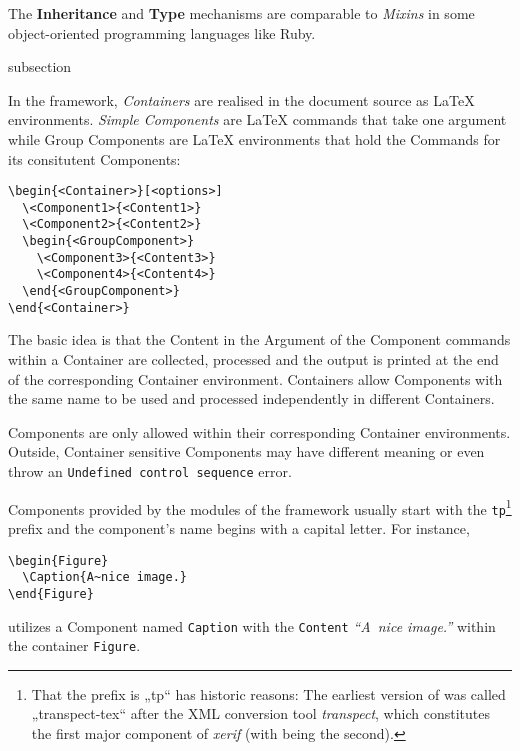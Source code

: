 The \textbf{Inheritance} and \textbf{Type} mechanisms are comparable
to \textit{Mixins} in some object-oriented programming languages like
Ruby.


\begin{Heading}{subsection}
\end{Heading}

In the {\CoCoTeX} framework, \textit{Containers} are realised in the
document source as {\LaTeX} environments. \textit{Simple Components}
are {\LaTeX} commands that take one argument while Group Components
are {\LaTeX} environments that hold the Commands for its consitutent
Components:
\begin{lstlisting}[style=tex]
\begin{<Container>}[<options>]
  \<Component1>{<Content1>}
  \<Component2>{<Content2>}
  \begin{<GroupComponent>}
    \<Component3>{<Content3>}
    \<Component4>{<Content4>}
  \end{<GroupComponent>}
\end{<Container>}
\end{lstlisting}

The basic idea is that the Content in the Argument of the
Component commands within a Container are collected,
processed and the output is printed at the end of the corresponding
Container environment. Containers allow Components with the same name
to be used and processed independently in different Containers.

Components are only allowed within their corresponding Container
environments. Outside, Container sensitive Components may have
different meaning or even throw an \texttt{Undefined control sequence}
error.

Components provided by the modules of the {\CoCoTeX} framework usually
start with the \lstinline{tp}\footnote{That the prefix is „tp“ has
  historic reasons: The earliest version of {\CoCoTeX} was called
  „transpect-tex“ after the XML conversion tool \textit{transpect},
  which constitutes the first major component of \textit{xerif} (with
  {\CoCoTeX} being the second).} prefix and the component's name
begins with a capital letter. For instance,
\begin{lstlisting}[style=tex]
\begin{Figure}
  \Caption{A~nice image.}
\end{Figure}
\end{lstlisting}
utilizes a Component named \texttt{Caption} with the \texttt{Content}
\textit{“A~nice image.”} within the container \texttt{Figure}.

